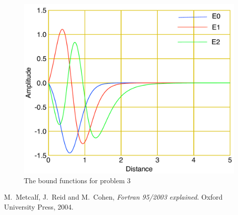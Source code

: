 \documentclass[12pt]{article}
\begin{document}
\begin {figure}[!htb]
	\includegraphics[width=1.\textwidth]{question_3/plot2.pdf}
	\caption{The bound functions for problem 3 }
	\label{image3twp}
\end {figure}



\begin{thebibliography}{}


 M.\ Metcalf, J.\ Reid and M.\ Cohen, {\it Fortran 95/2003 explained}. Oxford University Press, 2004.
 

\end{thebibliography}
\end{document}
